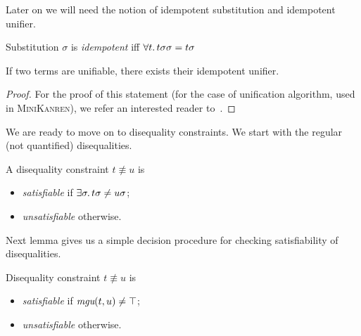 
Later on we will need the notion of idempotent substitution and idempotent unifier.

\begin{definition}
  \label{def:idempotent-subs}
  Substitution $\sigma$ is \emph{idempotent} iff
  $\forall t\ldotp {{t}{\sigma}}{\sigma} = {t}{\sigma}$
\end{definition}

\begin{lemma}
  \label{lemma:idempotent-unif}
  If two terms are unifiable, there exists their idempotent unifier.
\end{lemma}

\begin{proof}
  For the proof of this statement 
  (for the case of unification algorithm, used in \textsc{MiniKanren}),
  we refer an interested reader to~\cite{kumar2010nominal}.
\end{proof}

We are ready to move on to disequality constraints.
We start with the regular (not quantified) disequalities.

\begin{definition}
  \label{def:diseq-sat}
  A disequality constraint $t \not\equiv u$ is 
  \begin{itemize}
    \item \emph{satisfiable} if $\exists \sigma\ldotp {t}{\sigma} \neq {u}{\sigma}$;
    \item \emph{unsatisfiable} otherwise.
  \end{itemize}
\end{definition}

Next lemma gives us a simple decision procedure for checking 
satisfiability of disequalities.

\begin{lemma}
  \label{lemma:diseq-sat}
  Disequality constraint $t \not\equiv u$ is 
  \begin{itemize}
    \item \emph{satisfiable} if $\textit{mgu}(t, u) \neq \top$;
    \item \emph{unsatisfiable} otherwise.
  \end{itemize}
\end{lemma}

